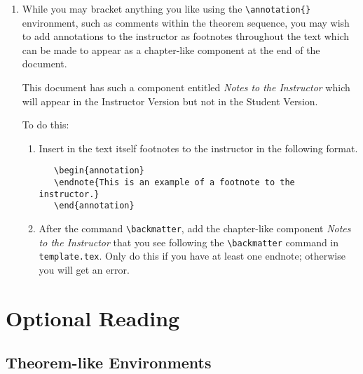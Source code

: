\begin{enumerate}
\item While you may bracket anything you like using the \verb|\annotation{}| environment,
such as comments within the theorem sequence, you may wish to add annotations
to the instructor as footnotes throughout the text which can be made to appear as a chapter-like
component at the end of the document.
\begin{annotation}
\end{annotation}
This document has such a
component entitled \emph{Notes to the Instructor} which will appear in the
Instructor Version but not in the Student Version.
\begin{annotation}
\end{annotation}
To do this:
\begin{enumerate}
   \item  Insert in the text itself footnotes to the instructor
       in the following format.
       \begin{verbatim}
   \begin{annotation}
   \endnote{This is an example of a footnote to the instructor.}
   \end{annotation}
       \end{verbatim}
   \item After the command \verb|\backmatter|, add the chapter-like component
       \emph{Notes to the Instructor} that you see following the
       \verb|\backmatter| command in \texttt{template.tex}.  Only do this if you have at
       least one endnote; otherwise you will get an error.
\end{enumerate}
\end{enumerate}



\chapter{Optional Reading}

\section{Theorem-like Environments}

